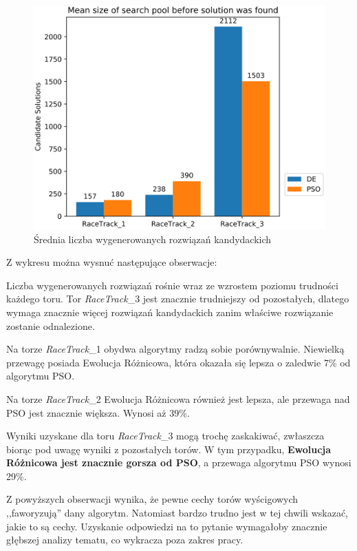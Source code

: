 \vspace{0.5cm}
\begin{figure}[H]
\centering
\includegraphics[width=14cm]{resources/figures/search_count.png}
\caption{Średnia liczba wygenerowanych rozwiązań kandydackich}
\label{SearchCount}
\end{figure}

Z wykresu można wysnuć następujące obserwacje:
\begin{enumerate*}
\item Liczba wygenerowanych rozwiązań rośnie wraz ze wzrostem poziomu trudności każdego toru. Tor \textit{RaceTrack}\_3 jest znacznie trudniejszy od pozostałych, dlatego wymaga znacznie więcej rozwiązań kandydackich zanim właściwe rozwiązanie zostanie odnalezione.
\item Na torze \textit{RaceTrack}\_1 obydwa algorytmy radzą sobie porównywalnie. Niewielką przewagę posiada Ewolucja Różnicowa, która okazała się lepsza o zaledwie 7\% od algorytmu PSO.
\item Na torze \textit{RaceTrack}\_2 Ewolucja Różnicowa również jest lepsza, ale przewaga nad PSO jest znacznie większa. Wynosi aż 39\%.
\item Wyniki uzyskane dla toru \textit{RaceTrack}\_3 mogą trochę zaskakiwać, zwłaszcza biorąc pod uwagę wyniki z pozostałych torów. W tym przypadku, \textbf{Ewolucja Różnicowa jest znacznie gorsza od PSO}, a przewaga algorytmu PSO wynosi 29\%.
\end{enumerate*}

\vspace{1cm}
Z powyższych obserwacji wynika, że pewne cechy torów wyścigowych ,,faworyzują'' dany algorytm. Natomiast bardzo trudno jest w tej chwili wskazać, jakie to są cechy. Uzyskanie odpowiedzi na to pytanie wymagałoby znacznie głębszej analizy tematu, co wykracza poza zakres pracy.

